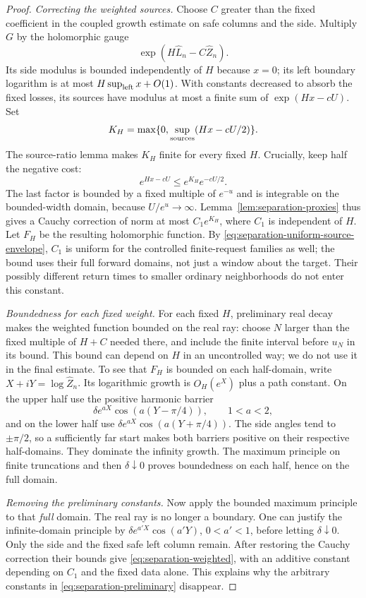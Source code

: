 \begin{proof}
\emph{Correcting the weighted sources.}
Choose $C$ greater than the fixed coefficient in the coupled
growth estimate on safe columns and the side.  Multiply $G$ by
the holomorphic gauge
\[
 \exp(H\widehat L_n-C\widehat Z_n).
\]
Its side modulus is bounded independently of $H$ because $x=0$;
its left boundary logarithm is at most
$H\sup_{\rm left}x+O(1)$.  With constants decreased to absorb
the fixed losses, its sources have modulus at most a finite sum
of $\exp(Hx-cU)$.  Set
\[
 K_H=\max\{0,\sup_{\rm sources}(Hx-cU/2)\}.
\]
The source-ratio lemma makes $K_H$ finite for every fixed $H$.
Crucially, keep half the negative cost:
\begin{equation}\label{eq:separation-spare-cost}
 e^{Hx-cU}\leq e^{K_H}e^{-cU/2}.
\end{equation}
The last factor is bounded by a fixed multiple of $e^{-u}$ and
is integrable on the bounded-width domain, because
$U/e^u\to\infty$.  Lemma~\ref{lem:separation-proxies} thus
gives a Cauchy correction of norm at most $C_1e^{K_H}$,
where $C_1$ is independent of $H$.  Let $F_H$ be the resulting
holomorphic function.
By \eqref{eq:separation-uniform-source-envelope}, $C_1$ is
uniform for the controlled finite-request families as well;
the bound uses their full forward domains, not just a window
about the target.  Their possibly different return times to
smaller ordinary neighborhoods do not enter this constant.

\emph{Boundedness for each fixed weight.}
For each fixed $H$, preliminary real decay makes the weighted
function bounded on the real ray: choose $N$ larger than the
fixed multiple of $H+C$ needed there, and include the finite
interval before $u_N$ in its bound.  This bound can depend on
$H$ in an uncontrolled way; we do not use it in the final
estimate.  To see that $F_H$ is bounded on each half-domain,
write $X+iY=\log\widehat Z_n$.  Its logarithmic growth is
$O_H(e^X)$ plus a path constant.  On the upper half use the
positive harmonic barrier
\[
 \delta e^{aX}\cos(a(Y-\pi/4)),\qquad 1<a<2,
\]
and on the lower half use
$\delta e^{aX}\cos(a(Y+\pi/4))$.
The side angles tend to $\pm\pi/2$, so a sufficiently far
start makes both barriers positive on their respective
half-domains.  They dominate the infinity growth.  The maximum
principle on finite truncations and then $\delta\downarrow0$
proves boundedness on each half, hence on the full domain.

\emph{Removing the preliminary constants.}
Now apply the bounded maximum principle to that \emph{full}
domain.  The real ray is no longer a boundary.  One can justify
the infinite-domain principle by
$\delta e^{a'X}\cos(a'Y)$, $0<a'<1$, before letting
$\delta\downarrow0$.  Only the side and the fixed safe left
column remain.  After restoring the Cauchy correction their
bounds give \eqref{eq:separation-weighted}, with an additive
constant depending on $C_1$ and the fixed data alone.  This
explains why the arbitrary constants in
\eqref{eq:separation-preliminary} disappear.


\end{proof}
